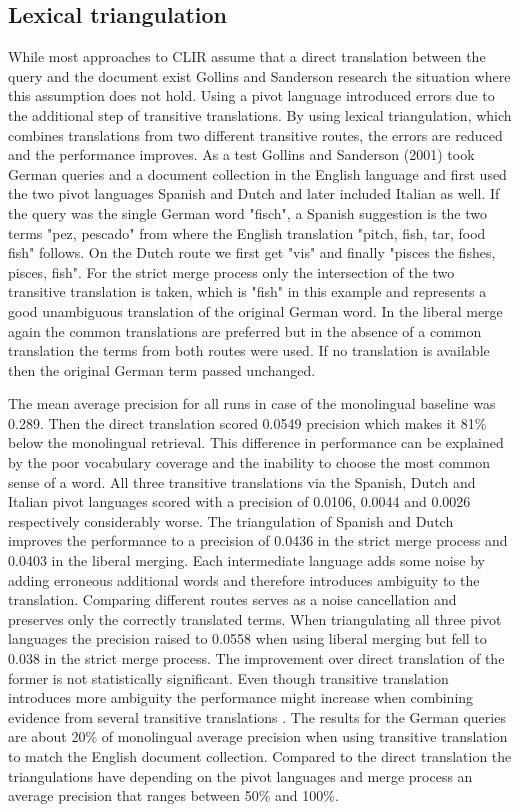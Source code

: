 \documentclass[journal]{IEEEtran}
\begin{document}
\subsection{Lexical triangulation}
While most approaches to CLIR assume that a direct translation between the query and the document exist Gollins and Sanderson \cite{gollins01} research the situation where this assumption does not hold.
Using a pivot language introduced errors due to the additional step of transitive translations.
By using lexical triangulation, which combines translations from two different transitive routes, the errors are reduced and the performance improves.
As a test Gollins and Sanderson (2001) took German queries and a document collection in the English language and first used the two pivot languages Spanish and Dutch and later included Italian as well.
If the query was the single German word "fisch", a Spanish suggestion is the two terms "pez, pescado" from where the English translation "pitch, fish, tar, food fish" follows.
On the Dutch route we first get "vis" and finally "pisces the fishes, pisces, fish".
For the strict merge process only the intersection of the two transitive translation is taken, which is "fish" in this example and represents a good unambiguous translation of the original German word.
In the liberal merge again the common translations are preferred but in the absence of a common translation the terms from both routes were used.
If no translation is available then the original German term passed unchanged.

The mean average precision for all runs in case of the monolingual baseline was 0.289.
Then the direct translation scored 0.0549 precision which makes it 81\% below the monolingual retrieval.
This difference in performance can be explained by the poor vocabulary coverage and the inability to choose the most common sense of a word.
All three transitive translations via the Spanish, Dutch and Italian pivot languages scored with a precision of 0.0106, 0.0044 and 0.0026 respectively considerably worse.
The triangulation of Spanish and Dutch improves the performance to a precision of 0.0436 in the strict merge process and 0.0403 in the liberal merging.
Each intermediate language adds some noise by adding erroneous additional words and therefore introduces ambiguity to the translation.
Comparing different routes serves as a noise cancellation and preserves only the correctly translated terms.
When triangulating all three pivot languages the precision raised to 0.0558 when using liberal merging but fell to 0.038 in the strict merge process.
The improvement over direct translation of the former is not statistically significant.
Even though transitive translation introduces more ambiguity the performance might increase when combining evidence from several transitive translations \cite{ballesteros00}.
The results for the German queries are about 20\% of monolingual average precision when using transitive translation to match the English document collection.
Compared to the direct translation the triangulations have depending on the pivot languages and merge process an average precision that ranges between 50\% and 100\%.
\end{document}
